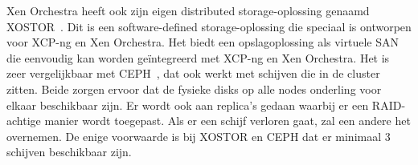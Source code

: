 Xen Orchestra heeft ook zijn eigen distributed storage-oplossing genaamd XOSTOR~\autocite{xostor-docs}. Dit is een software-defined storage-oplossing die speciaal is ontworpen voor XCP-ng en Xen Orchestra. Het biedt een opslagoplossing als virtuele SAN die eenvoudig kan worden geïntegreerd met XCP-ng en Xen Orchestra.
Het is zeer vergelijkbaar met CEPH~\autocite{weil2006ceph}, dat ook werkt met schijven die in de cluster zitten. Beide zorgen ervoor dat de fysieke disks op alle nodes onderling voor elkaar beschikbaar zijn. Er wordt ook aan replica’s gedaan waarbij er een RAID-achtige manier wordt toegepast.
Als er een schijf verloren gaat, zal een andere het overnemen. De enige voorwaarde is bij XOSTOR en CEPH dat er minimaal 3 schijven beschikbaar zijn.